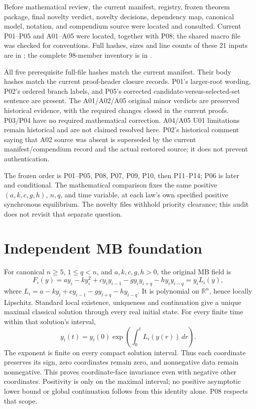\documentclass[11pt]{article}
\newcommand{\R}{\mathbb R}
\begin{document}
Before mathematical review, the current manifest, registry, frozen
theorem package, final novelty verdict, novelty decisions, dependency
map, canonical model, notation, and compendium source were located and
consulted. Current P01--P05 and A01--A05 were located, together with P08;
the shared macro file was checked for conventions. Full hashes, sizes
and line counts of these 21 inputs are in
; the complete 98-member inventory is
in .

All five prerequisite full-file hashes match the current manifest.
Their body hashes match the current proof-header closure records. P01's
larger-root wording, P02's ordered branch labels, and P05's corrected
candidate-versus-selected-set sentence are present. The A01/A02/A05
original minor verdicts are preserved historical evidence, with the
required changes closed in the current proofs. P03/P04 have no required
mathematical correction. A04/A05 U01 limitations remain historical and
are not claimed resolved here. P02's historical comment saying that A02
source was absent is superseded by the current manifest/compendium record
and the actual restored source; it does not prevent authentication.

The frozen order is P01--P05, P08, P07, P09, P10, then P11--P14;
P06 is later and conditional. The mathematical comparison fixes the
same positive $(a,k,c,g,h)$, $n,q$, and time variable, at each law's own
specified positive synchronous equilibrium. The novelty files withhold
priority clearance; this audit does not revisit that separate question.

\section{Independent MB foundation}
For canonical $n\ge5$, $1\le q<n$, and $a,k,c,g,h>0$, the original MB
field is
\[
 F_i(y)=ay_i-ky_i^2+cy_i y_{i-1}-gy_i y_{i+q}-hy_i y_{i-q}
       =y_i L_i(y),
\]
where $L_i=a-ky_i+cy_{i-1}-gy_{i+q}-hy_{i-q}$.
It is polynomial on $\R^n$, hence locally Lipschitz. Standard local
existence, uniqueness and continuation give a unique maximal classical
solution through every real initial state. For every finite time within
that solution's interval,
\[
 y_i(t)=y_i(0)\exp\!\left(\int_0^t L_i(y(r))\,dr\right).
\]
The exponent is finite on every compact solution interval. Thus each
coordinate preserves its sign, zero coordinates remain zero, and
nonnegative data remain nonnegative. This proves coordinate-face
invariance even with negative other coordinates. Positivity is only on
the maximal interval; no positive asymptotic lower bound or global
continuation follows from this identity alone. P08 respects that scope.
\end{document}
